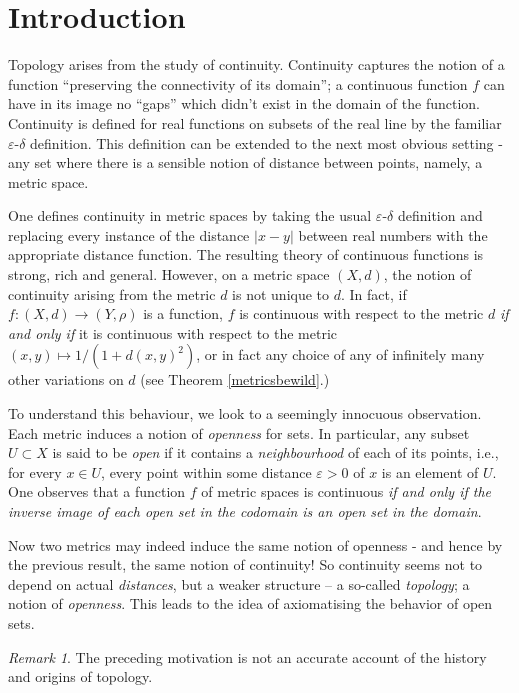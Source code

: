 \documentclass{book}
\theoremstyle{definition}
\theoremstyle{remark}
\newtheorem{remark}{Remark}[section]
\begin{document}
\section{Introduction}
Topology arises from the study of continuity. Continuity captures the notion of a function ``preserving the connectivity of its domain''; a continuous function $f$ can have in its image no ``gaps'' which didn't exist in the domain of the function. Continuity is defined for real functions on subsets of the real line by the familiar $\varepsilon$-$\delta$ definition. This definition can be extended to the next most obvious setting - any set where there is a sensible notion of distance between points, namely, a metric space.\par
One defines continuity in metric spaces by taking the usual $\varepsilon$-$\delta$ definition and replacing every instance of the distance $|x-y|$ between real numbers with the appropriate distance function. The resulting theory of continuous functions is strong, rich and general. However, on a metric space $(X,d)$, the notion of continuity arising from the metric $d$ is not unique to $d$. In fact, if $f:(X,d)\to (Y,\rho)$ is a function, $f$ is continuous with respect to the metric $d$ \textit{if and only if} it is continuous with respect to the metric $(x,y)\mapsto 1/(1+d(x,y)^2)$, or in fact any choice of any of infinitely many other variations on $d$ (see Theorem \ref{metricsbewild}.)\par
To understand this behaviour, we look to a seemingly innocuous observation. Each metric induces a notion of \textit{openness} for sets. In particular, any subset $U\subset X$ is said to be \textit{open} if it contains a \textit{neighbourhood} of each of its points, i.e., for every $x\in U$, every point within some distance $\varepsilon>0$ of $x$ is an element of $U$. One observes that a function $f$ of metric spaces is continuous \textit{if and only if the inverse image of each open set in the codomain is an open set in the domain}.\par
Now two metrics may indeed induce the same notion of openness - and hence by the previous result, the same notion of continuity! So continuity seems not to depend on actual \textit{distances}, but a weaker structure -- a so-called \textit{topology}; a notion of \textit{openness}. This leads to the idea of axiomatising the behavior of open sets.

\begin{remark}
The preceding motivation is not an accurate account of the history and origins of topology.
\end{remark}
\end{document}

